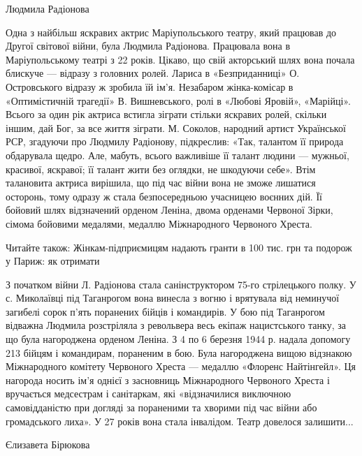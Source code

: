 Людмила Радіонова

Одна з найбільш яскравих актрис Маріупольського театру, який працював до Другої
світової війни, була Людмила Радіонова. Працювала вона в Маріупольському театрі
з 22 років. Цікаво, що свій акторський шлях вона почала блискуче — відразу з
головних ролей. Лариса в «Безприданниці» О. Островського відразу ж зробила їй
ім'я. Незабаром жінка-комісар в «Оптимістичній трагедії» В. Вишневського, ролі
в «Любові Яровій», «Марійці». Всього за один рік актриса встигла зіграти
стільки яскравих ролей, скільки іншим, дай Бог, за все життя зіграти. М.
Соколов, народний артист Української РСР, згадуючи про Людмилу Радіонову,
підкреслив: «Так, талантом її природа обдарувала щедро. Але, мабуть, всього
важливіше її талант людини — мужньої, красивої, яскравої; її талант жити без
оглядки, не шкодуючи себе». Втім талановита актриса вирішила, що під час війни
вона не зможе лишатися осторонь, тому одразу ж стала безпосередньою учасницею
воєнних дій. Її бойовий шлях відзначений орденом Леніна, двома орденами
Червоної Зірки, сімома бойовими медалями, медаллю Міжнародного Червоного
Хреста.

Читайте також: Жінкам-підприємицям надають гранти в 100 тис. грн та подорож у
Париж: як отримати

З початком війни Л. Радіонова стала санінструктором 75-го стрілецького полку. У
с. Миколаївці під Таганрогом вона винесла з вогню і врятувала від неминучої
загибелі сорок п'ять поранених бійців і командирів. У бою під Таганрогом
відважна Людмила розстріляла з револьвера весь екіпаж нацистського танку, за що
була нагороджена орденом Леніна. З 4 по 6 березня 1944 р. надала допомогу 213
бійцям і командирам, пораненим в бою. Була нагороджена вищою відзнакою
Міжнародного комітету Червоного Хреста — медаллю «Флоренс Найтінгейл». Ця
нагорода носить ім'я однієї з засновниць Міжнародного Червоного Хреста і
вручається медсестрам і санітаркам, які «відзначилися виключною самовідданістю
при догляді за пораненими та хворими під час війни або громадського лиха». У 27
років вона стала інвалідом. Театр довелося залишити... 

Єлизавета Бірюкова 

